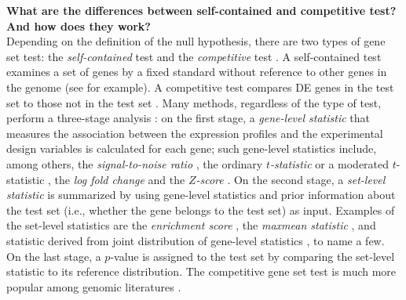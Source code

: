 \documentclass[11pt, a4paper]{article}
\begin{document}
	 	\textbf{What are the differences between self-contained and competitive test? And how does they work?}\\
	 Depending on the definition of the null hypothesis, there are two types of gene set test: the \textit{self-contained} test and the \textit{competitive} test \citep{goeman2007analyzing}. A self-contained test examines a set of genes by a fixed standard without reference to other genes in the genome (see \cite{goeman2004global,goeman2005testing, tsai2009multivariate, wu2010roast, huang2013gene} for example). A competitive test compares DE
	 genes in the test set to those not in the test set \citep{tian2005discovering, wu2012camera, yaari2013quantitative}. Many methods, regardless of the type of test, perform a three-stage analysis \citep{khatri2012ten}: on the first stage, a \textit{gene-level statistic} that measures the association between the expression profiles and the experimental design variables is calculated for each gene; such gene-level statistics include, among others, the \textit{signal-to-noise ratio} \citep{subramanian2005gene}, the ordinary \textit{$t$-statistic} \citep{tian2005discovering} or a moderated $t$-statistic \citep{Smyth2004moderated}, the \textit{log fold change} \citep{kim2005page} and the \textit{$Z$-score} \citep{efron2007correlation}. On the second stage, a \textit{set-level statistic} is summarized by using gene-level statistics and prior information about the test set (i.e., whether the gene belongs to the test set) as input. Examples of the set-level statistics are the \textit{enrichment score} \citep{subramanian2005gene}, the \textit{maxmean statistic} \citep{efron2007testing}, and statistic derived from joint distribution of gene-level statistics \citep{yaari2013quantitative}, to name a few. On the last stage, a $p$-value is assigned to the test set by comparing the set-level statistic to its reference distribution. The competitive gene set test is much more popular among genomic literatures \citep{goeman2007analyzing, gatti2010heading}.  
	 
	
\end{document}
